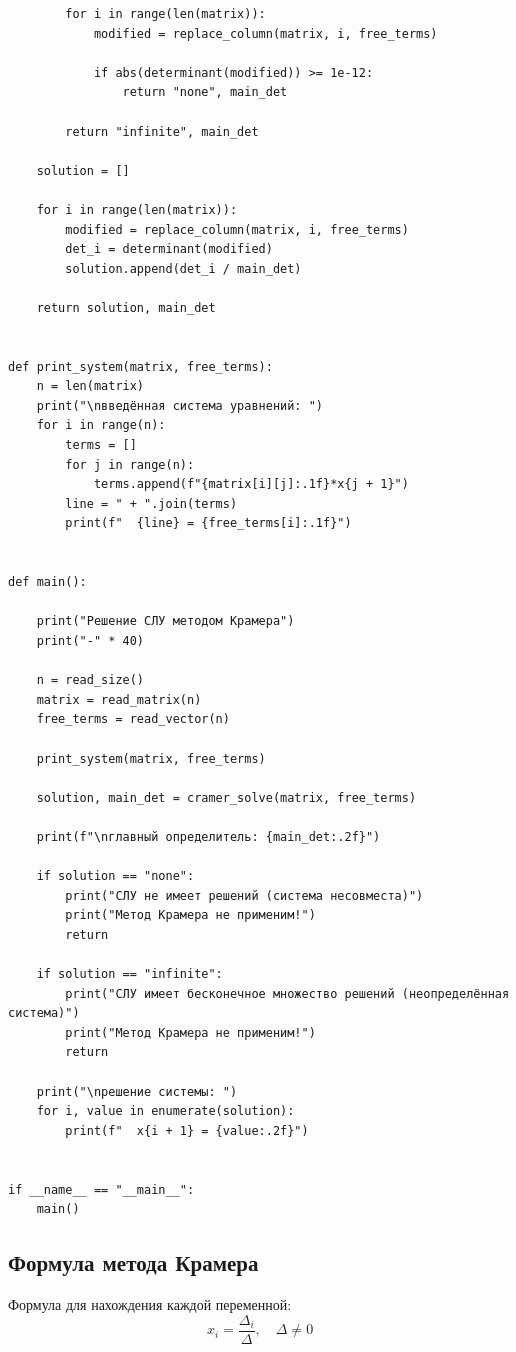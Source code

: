 \documentclass[14pt,a4paper]{scrartcl}
\begin{document}
\begin{verbatim}
        for i in range(len(matrix)):
            modified = replace_column(matrix, i, free_terms)

            if abs(determinant(modified)) >= 1e-12:
                return "none", main_det

        return "infinite", main_det

    solution = []

    for i in range(len(matrix)):
        modified = replace_column(matrix, i, free_terms)
        det_i = determinant(modified)
        solution.append(det_i / main_det)

    return solution, main_det


def print_system(matrix, free_terms):
    n = len(matrix)
    print("\nвведённая система уравнений: ")
    for i in range(n):
        terms = []
        for j in range(n):
            terms.append(f"{matrix[i][j]:.1f}*x{j + 1}")
        line = " + ".join(terms)
        print(f"  {line} = {free_terms[i]:.1f}")


def main():
    
    print("Решение СЛУ методом Крамера")
    print("-" * 40)

    n = read_size()
    matrix = read_matrix(n)
    free_terms = read_vector(n)

    print_system(matrix, free_terms)

    solution, main_det = cramer_solve(matrix, free_terms)

    print(f"\nглавный определитель: {main_det:.2f}")

    if solution == "none":
        print("СЛУ не имеет решений (система несовместа)")
        print("Метод Крамера не применим!")
        return

    if solution == "infinite":
        print("СЛУ имеет бесконечное множество решений (неопределённая система)")
        print("Метод Крамера не применим!")
        return

    print("\nрешение системы: ")
    for i, value in enumerate(solution):
        print(f"  x{i + 1} = {value:.2f}")


if __name__ == "__main__":
    main()
\end{verbatim}

\subsection{Формула метода Крамера}
\label{sec:mathexample}

Формула для нахождения каждой переменной:
\begin{equation}\label{eq:cramer}
x_i = \frac{\Delta_i}{\Delta}, \quad \Delta \neq 0
\end{equation}
\end{document}
